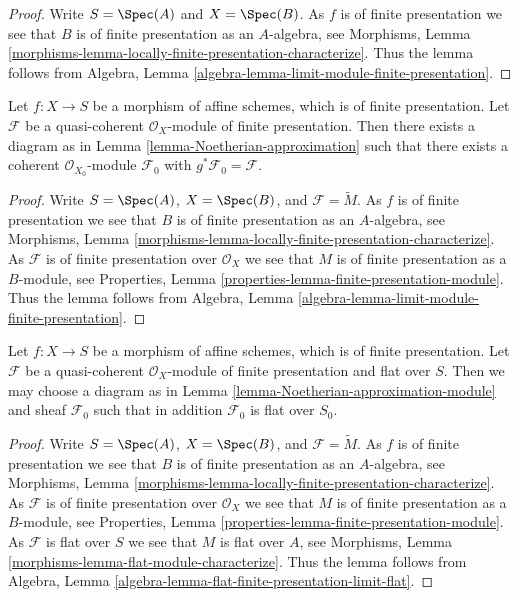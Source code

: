 \begin{proof}
Write $S = \Spec(A)$ and $X = \Spec(B)$.
As $f$ is of finite presentation we see that
$B$ is of finite presentation as an $A$-algebra, see
Morphisms,
Lemma \ref{morphisms-lemma-locally-finite-presentation-characterize}.
Thus the lemma follows from
Algebra, Lemma \ref{algebra-lemma-limit-module-finite-presentation}.
\end{proof}

\begin{lemma}
\label{lemma-Noetherian-approximation-module}
Let $f : X \to S$ be a morphism of affine schemes, which is of finite
presentation. Let $\mathcal{F}$ be a quasi-coherent $\mathcal{O}_X$-module
of finite presentation. Then there exists a diagram as in
Lemma \ref{lemma-Noetherian-approximation}
such that there exists a coherent $\mathcal{O}_{X_0}$-module $\mathcal{F}_0$
with $g^*\mathcal{F}_0 = \mathcal{F}$.
\end{lemma}

\begin{proof}
Write $S = \Spec(A)$, $X = \Spec(B)$, and
$\mathcal{F} = \widetilde{M}$. As $f$ is of finite presentation we see that
$B$ is of finite presentation as an $A$-algebra, see
Morphisms,
Lemma \ref{morphisms-lemma-locally-finite-presentation-characterize}.
As $\mathcal{F}$ is of finite presentation over $\mathcal{O}_X$ we see that
$M$ is of finite presentation as a $B$-module, see
Properties, Lemma \ref{properties-lemma-finite-presentation-module}.
Thus the lemma follows from
Algebra, Lemma \ref{algebra-lemma-limit-module-finite-presentation}.
\end{proof}

\begin{lemma}
\label{lemma-Noetherian-approximation-flat-module}
Let $f : X \to S$ be a morphism of affine schemes, which is of finite
presentation. Let $\mathcal{F}$ be a quasi-coherent $\mathcal{O}_X$-module
of finite presentation and flat over $S$. Then we may choose a diagram as in
Lemma \ref{lemma-Noetherian-approximation-module}
and sheaf $\mathcal{F}_0$ such that in addition $\mathcal{F}_0$
is flat over $S_0$.
\end{lemma}

\begin{proof}
Write $S = \Spec(A)$, $X = \Spec(B)$, and
$\mathcal{F} = \widetilde{M}$. As $f$ is of finite presentation we see that
$B$ is of finite presentation as an $A$-algebra, see
Morphisms,
Lemma \ref{morphisms-lemma-locally-finite-presentation-characterize}.
As $\mathcal{F}$ is of finite presentation over $\mathcal{O}_X$ we see that
$M$ is of finite presentation as a $B$-module, see
Properties, Lemma \ref{properties-lemma-finite-presentation-module}.
As $\mathcal{F}$ is flat over $S$ we see that $M$ is flat over $A$, see
Morphisms, Lemma \ref{morphisms-lemma-flat-module-characterize}.
Thus the lemma follows from
Algebra, Lemma \ref{algebra-lemma-flat-finite-presentation-limit-flat}.
\end{proof}

